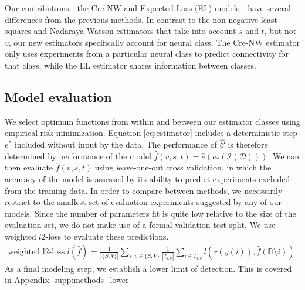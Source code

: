 Our contributions - the Cre-NW and Expected Loss (EL) models - have several differences from the previous methods.
In contrast to the \citet{Oh2014-kh} non-negative least squares and \citet{Knox2019-ot} Nadaraya-Watson estimators that take into account $s$ and $t$, but not $v$, our new estimators specifically account for neural class.
The Cre-NW estimator only uses experiments from a particular neural class to predict connectivity for that class, while the EL estimator shares information between classes.



\newpage

\subsection{Model evaluation}

We select optimum functions from within and between our estimator classes using empirical risk minimization.
Equation \ref{eq:estimator}  includes a deterministic step $e^*$ included without input by the data.
The performance of $\widehat {\mathcal C}$ is therefore determined by performance of the model $\widehat f(v,s,t) = \widehat e (e_*(\mathcal{I} (\mathcal D)))$.
We can then evaluate $\widehat f(v,s,t)$ using {\textit leave-one-out cross validation}, in which the accuracy of the model is assessed by its ability to predict experiments excluded from the training data.
In order to compare between methods, we necessarily restrict to the smallest set of evaluation experiments suggested by any of our models.
Since the number of parameters fit is quite low relative to the size of the evaluation set, we do not make use of a formal validation-test split.
We use weighted $l2$-loss to evaluate these predictions.
\begin{align*}
\text{weighted l2-loss } l ( \hat f) &= \frac{1}{|\{S,V\}|} \sum_{s,v \in \{S,V\}} \frac{1}{ |I_{s,v}|} \sum_{i \in I_{s,v} } l(r(y(i)), \hat f(\mathbb D \setminus i)) .
\end{align*}
As a final modeling step, we establish a lower limit of detection.
This is covered in Appendix \ref{supp:methods_lower}


